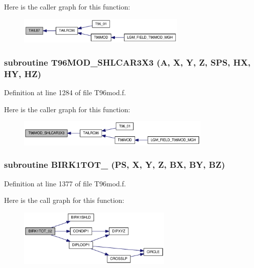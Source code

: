 Here is the caller graph for this function:\nopagebreak
\begin{figure}[H]
\begin{center}
\leavevmode
\includegraphics[width=229pt]{_t96mod_8f_f7a0147645dfe77e8197e10963ed3770_icgraph}
\end{center}
\end{figure}
\hypertarget{_t96mod_8f_0918ae2ac8568570f93f2d5c0d88f9dc}{
\subsubsection[{T96MOD\_\-SHLCAR3X3}]{\setlength{\rightskip}{0pt plus 5cm}subroutine T96MOD\_\-SHLCAR3X3 (A, \/  X, \/  Y, \/  Z, \/  SPS, \/  HX, \/  HY, \/  HZ)}}
\label{_t96mod_8f_0918ae2ac8568570f93f2d5c0d88f9dc}




Definition at line 1284 of file T96mod.f.

Here is the caller graph for this function:\nopagebreak
\begin{figure}[H]
\begin{center}
\leavevmode
\includegraphics[width=263pt]{_t96mod_8f_0918ae2ac8568570f93f2d5c0d88f9dc_icgraph}
\end{center}
\end{figure}
\hypertarget{_t96mod_8f_1d35065857c1597a4d45699d6e30faa9}{
\subsubsection[{BIRK1TOT\_\-02}]{\setlength{\rightskip}{0pt plus 5cm}subroutine BIRK1TOT\_ (PS, \/  X, \/  Y, \/  Z, \/  BX, \/  BY, \/  BZ)}}
\label{_t96mod_8f_1d35065857c1597a4d45699d6e30faa9}




Definition at line 1377 of file T96mod.f.

Here is the call graph for this function:\nopagebreak
\begin{figure}[H]
\begin{center}
\leavevmode
\includegraphics[width=209pt]{_t96mod_8f_1d35065857c1597a4d45699d6e30faa9_cgraph}
\end{center}
\end{figure}


